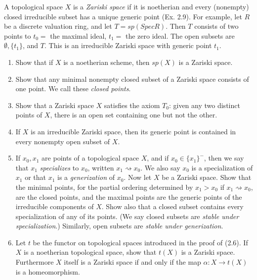 \begin{exercise}
	A topological space $X$ is a \textit{Zariski space} if it is noetherian and every (nonempty) closed irreducible subset has a unique generic point (Ex. 2.9). For example, let $R$ be a discrete valuation ring, and let $T = sp(Spec R)$. Then $T$ consists of two points to $t_{0} =$ the maximal ideal, $t_1 =$ the zero ideal. The open subsets are $\emptyset, \{t_{1}\}$, and $T$. This is an irreducible Zariski space with generic point $t_1$.
	\begin{enumerate}
		\item Show that if $X$ is a noetherian scheme, then $sp(X)$ is a Zariski space.
		\item Show that any minimal nonempty closed subset of a Zariski space consists of one point. We call these \textit{closed points}.
		\item Show that a Zariski space $X$ satisfies the axiom $T_0$: given any two distinct points of $X$, there is an open set containing one but not the other.
		\item If $X$ is an irreducible Zariski space, then its generic point is contained in every nonempty open subset of $X$.
		\item If $x_0,x_1$ are points of a topological space $X$, and if $x_0 \in \{x_{1}\}^-$, then we say that $x_{1}$ \textit{specializes} to $x_0$, written $x_{1} \rightsquigarrow x_{0}$. We also say $x_0$ is a specialization of $x_{1}$ or that $x_{1} $ is a \textit{generization} of $x_{0}$. Now let $X$ be a Zariski space. Show that the minimal points, for the partial ordering determined by $x_{1} > x_{0}$ if $x_{1} \rightsquigarrow x_{0}$, are the closed points, and the maximal points are the generic points of the irreducible components of $X$. Show also that a closed subset contains every specialization of any of its points. (We say closed subsets are \textit{stable under specialization}.) Similarly, open subsets are \textit{stable under generization}.
		\item Let $t$ be the functor on topological spaces introduced in the proof of (2.6). If $X$ is a noetherian topological space, show that $t(X)$ is a Zariski space. Furthermore $X$ itself is a Zariski space if and only if the map $\alpha: X \to t(X)$ is a homeomorphism.
\end{enumerate}
\end{exercise}
